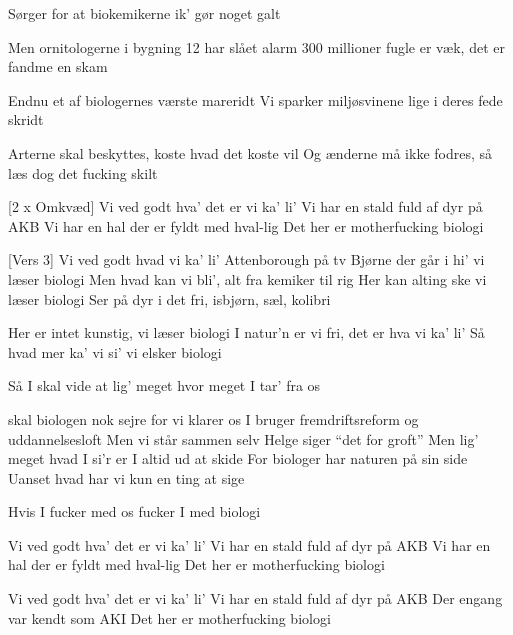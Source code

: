 \documentclass[a4paper,11pt]{article}
\begin{document}
\begin{song}
Sørger for at biokemikerne ik’ gør noget galt

Men ornitologerne i bygning 12 har slået alarm
300 millioner fugle er væk, det er fandme en skam

Endnu et af biologernes værste mareridt
Vi sparker miljøsvinene lige i deres fede skridt

Arterne skal beskyttes, koste hvad det koste vil
Og ænderne må ikke fodres, så læs dog det fucking skilt

[2 x Omkvæd]
Vi ved godt hva’ det er vi ka' li'
Vi har en stald fuld af dyr på AKB
Vi har en hal der er fyldt med hval-lig
Det her er motherfucking biologi

[Vers 3]
Vi ved godt hvad vi ka' li' Attenborough på tv
Bjørne der går i hi’ vi læser biologi
Men hvad kan vi bli', alt fra kemiker til rig
Her kan alting ske vi læser biologi
Ser på dyr i det fri, isbjørn, sæl, kolibri

Her er intet kunstig, vi læser biologi
I natur’n er vi fri, det er hva vi ka' li'
Så hvad mer ka’ vi si’ vi elsker biologi

Så I skal vide at lig’ meget hvor meget I tar’ fra os 

skal biologen nok sejre for vi klarer os
I bruger fremdriftsreform og uddannelsesloft
Men vi står sammen selv Helge siger “det for groft”
Men lig’ meget hvad I si'r er I altid ud at skide
For biologer har naturen på sin side
Uanset hvad har vi kun en ting at sige

Hvis I fucker med os fucker I med biologi


Vi ved godt hva’ det er vi ka' li'
Vi har en stald fuld af dyr på AKB
Vi har en hal der er fyldt med hval-lig
Det her er motherfucking biologi


Vi ved godt hva’ det er vi ka' li'
Vi har en stald fuld af dyr på AKB
Der engang var kendt som AKI
Det her er motherfucking biologi



\end{song}
\end{document}
